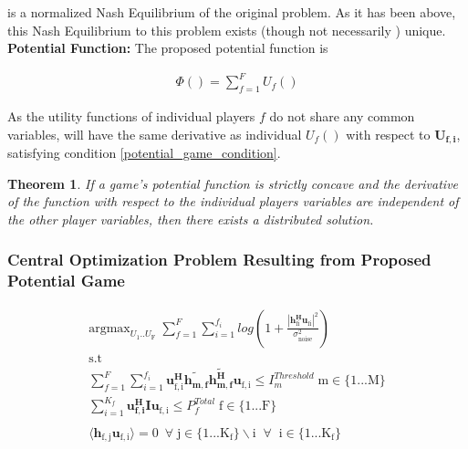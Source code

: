 \documentclass[12pt]{article}
\newtheorem{theorem}{Theorem}
\begin{document}
is a normalized Nash Equilibrium of the original problem.
As it has been above, this Nash Equilibrium to this problem exists (though not necessarily ) unique. 
\\
\textbf{Potential Function:} The proposed potential function is 

\begin{gather*} \label{Potential_Function}
\Phi() = \sum_{f = 1}^{F} U_f() 
\end{gather*}


As the utility functions of individual players $f$ do not share any common variables,  \label{Potential_Function} will have the same derivative as individual $U_f()$ with respect to $\mathbf{U_{f,i}} $, satisfying condition \eqref{potential_game_condition}. 

\begin{theorem}\label{distributed}
\cite{ghosh2015normalized}
If a game's potential function is strictly concave and the derivative of the function with respect to the individual players variables are independent of the other player variables, then there exists a distributed solution.
\end{theorem}
\subsubsection{Central Optimization Problem Resulting from Proposed Potential Game}

\begin{gather}\label{potential_game}
\mathrm{argmax}_{U_{\mathrm{1}}.. U_{\mathrm{F}}}
\;
\sum_{f=1}^F
\sum_{i=1}^{f_i}
log(1+\frac{|\mathbf{h^H_{\mathrm{fi}}u_{ \mathrm{fi}}}|^2}{\sigma^2_{ \mathrm{noise}} })
\\
\mathrm{s.t}
\\
\sum_{f=1}^F
\sum_{i=1}^{f_i}
\mathbf{u_{ \mathrm{f,i}}^H} \mathbf{\tilde{h_{m,f}}} \mathbf{\tilde{h_{m,f}^H}} \mathbf{u_{\mathrm{f,i}}} \leq I^{Threshold}_{m} \;  \mathrm{m} \in  \mathrm{\{1 ... M\}}
\\
\sum_{i=1}^{K_f}\mathbf{u_{f,i}^H} \mathbf{I} \mathbf{u_{\mathrm{f,i}}} \leq  P^{Total}_{f}
\; \mathrm{f} \in \mathrm{\{1 ... F\}}
\\
\\
\langle \mathbf{h_{\mathrm{f,j}}}\mathbf{u_{\mathrm{f,i}}} \rangle =0\ \; \forall \; \mathrm{j \in \{1 ... K_f\}\backslash i \;\; 
}
\forall \;\;\mathrm{ i \in \{1 ... K_f\}}
\end{gather}
\end{document}
